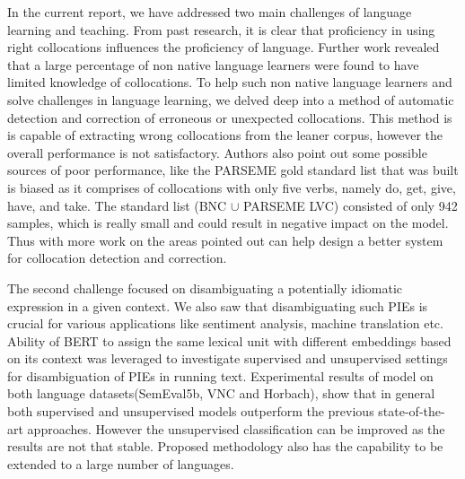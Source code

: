 \documentclass[11pt,a4paper]{article}
\begin{document}
In the current report, we have addressed two main challenges of language learning and teaching. From past research, it is clear that proficiency in using right collocations influences the proficiency of language. Further work revealed that a large percentage of non native language learners were found to have limited knowledge of collocations. To help such non native language learners and solve challenges in language learning, we delved deep into a method of automatic detection and correction of erroneous or unexpected collocations. 
This method is is capable of extracting wrong collocations from the leaner corpus, however the overall performance is not satisfactory. Authors also point out some possible sources of poor performance, like the PARSEME gold standard list that was built is biased as it comprises of collocations with only five verbs, namely do, get, give, have, and take. The standard list (BNC $\cup$ PARSEME LVC) consisted of only 942 samples, which is really small and could result in negative impact on the model. Thus with more work on the areas pointed out can help design a better system for collocation detection and correction.

The second challenge focused on disambiguating a potentially idiomatic expression in a given context. 
We also saw that disambiguating such PIEs is crucial for various applications like sentiment analysis, machine translation etc. 
Ability of BERT to assign the same lexical unit with different embeddings based on its context was leveraged to investigate supervised and unsupervised settings for disambiguation of PIEs in running text. Experimental results of model on both language datasets(SemEval5b, VNC and Horbach), show that in general both supervised and unsupervised models outperform the previous state-of-the-art approaches. However the unsupervised classification can be improved as the results are not that stable. Proposed methodology also has the capability to be extended to a large number of languages.





\end{document}
